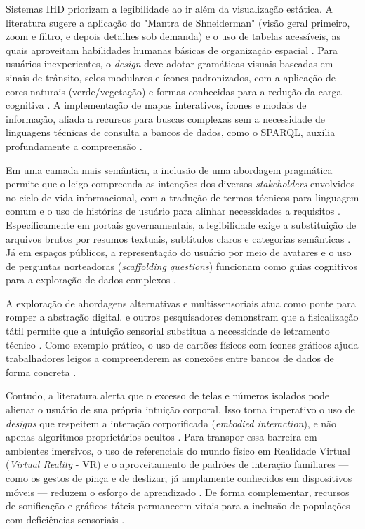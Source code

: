 \documentclass[
	12pt,				%
	oneside,			%
	a4paper,			%
	english,			%
	brazil				%
	]{abntex2ppgsi}
\begin{document}
    Sistemas IHD priorizam a legibilidade ao ir além da visualização estática. A literatura sugere a aplicação do "Mantra de Shneiderman" (visão geral primeiro, zoom e filtro, e depois detalhes sob demanda) e o uso de tabelas acessíveis, as quais aproveitam habilidades humanas básicas de organização espacial \cite{Paredes2022317, Bartram2022, Victorelli2020Human}. Para usuários inexperientes, o \textit{design} deve adotar gramáticas visuais baseadas em sinais de trânsito, selos modulares e ícones padronizados, com a aplicação de cores naturais (verde/vegetação) e formas conhecidas para a redução da carga cognitiva \cite{Yuan20243615, Chatzimichali2021160, Lindley2020, Coleti2020TR, Capeleti2024Human}. A implementação de mapas interativos, ícones e modais de informação, aliada a recursos para buscas complexas sem a necessidade de linguagens técnicas de consulta a bancos de dados, como o SPARQL, auxilia profundamente a compreensão \cite{Belizario2023Interacao}. 

    Em uma camada mais semântica, a inclusão de uma abordagem pragmática permite que o leigo compreenda as intenções dos diversos \textit{stakeholders} envolvidos no ciclo de vida informacional, com a tradução de termos técnicos para linguagem comum e o uso de histórias de usuário para alinhar necessidades a requisitos \cite{Hornung2015, Capeleti2024Human, Strey2019Human}. Especificamente em portais governamentais, a legibilidade exige a substituição de arquivos brutos por resumos textuais, subtítulos claros e categorias semânticas \cite{Haghighati2020, Koesten2020, JoseViterbo2020}. Já em espaços públicos, a representação do usuário por meio de avatares e o uso de perguntas norteadoras (\textit{scaffolding questions}) funcionam como guias cognitivos para a exploração de dados complexos \cite{Friedman2024, Alhakamy2020246, Trajkova2020}.

    A exploração de abordagens alternativas e multissensoriais atua como ponte para romper a abstração digital.  e outros pesquisadores demonstram que a fisicalização tátil permite que a intuição sensorial substitua a necessidade de letramento técnico \cite{DeKreij2024, Burzio2024, Kreij, Ranasinghe2023, Lee-Smith2023, Xia2021}. Como exemplo prático, o uso de cartões físicos com ícones gráficos ajuda trabalhadores leigos a compreenderem as conexões entre bancos de dados de forma concreta \cite{Seidelin2018}.

    Contudo, a literatura alerta que o excesso de telas e números isolados pode alienar o usuário de sua própria intuição corporal. Isso torna imperativo o uso de \textit{designs} que respeitem a interação corporificada (\textit{embodied interaction}), e não apenas algoritmos proprietários ocultos \cite{Parviainen2016}. Para transpor essa barreira em ambientes imersivos, o uso de referenciais do mundo físico em Realidade Virtual (\textit{Virtual Reality} - VR) e o aproveitamento de padrões de interação familiares — como os gestos de pinça e de deslizar, já amplamente conhecidos em dispositivos móveis — reduzem o esforço de aprendizado \cite{Kurze2023, Xie2021365, Roberts2017343}. De forma complementar, recursos de sonificação e gráficos táteis permanecem vitais para a inclusão de populações com deficiências sensoriais \cite{Lenzi2024, Lenzi, Roberts2023}.
\end{document}

